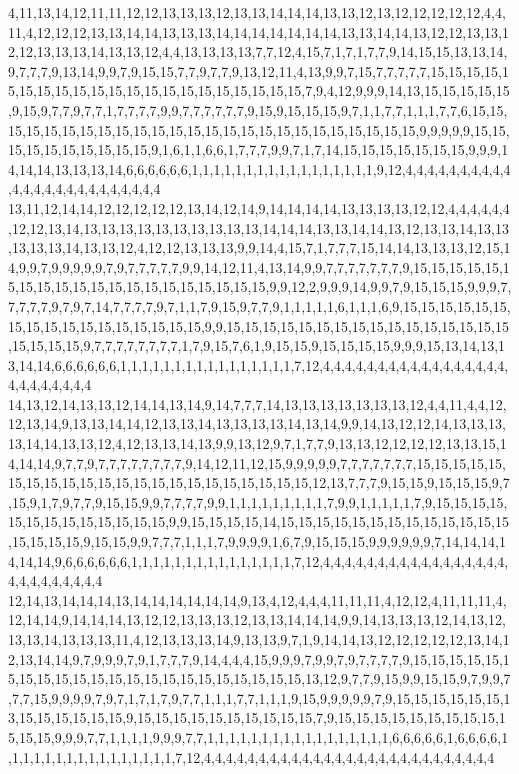 4,11,13,14,12,11,11,12,12,13,13,13,12,13,13,14,14,14,13,13,12,13,12,12,12,12,12,4,4,11,4,12,12,12,13,13,14,14,13,13,13,14,14,14,14,14,14,14,13,13,14,14,13,12,12,13,13,12,12,13,13,13,14,13,13,12,4,4,13,13,13,13,7,7,12,4,15,7,1,7,1,7,7,9,14,15,15,13,13,14,9,7,7,7,9,13,14,9,9,7,9,15,15,7,7,9,7,7,9,13,12,11,4,13,9,9,7,15,7,7,7,7,7,15,15,15,15,15,15,15,15,15,15,15,15,15,15,15,15,15,15,15,15,15,7,9,4,12,9,9,9,14,13,15,15,15,15,15,9,15,9,7,7,9,7,7,1,7,7,7,7,9,9,7,7,7,7,7,7,9,15,9,15,15,15,9,7,1,1,7,7,1,1,1,7,7,6,15,15,15,15,15,15,15,15,15,15,15,15,15,15,15,15,15,15,15,15,15,15,15,15,15,9,9,9,9,9,15,15,15,15,15,15,15,15,15,15,9,1,6,1,1,6,6,1,7,7,7,9,9,7,1,7,14,15,15,15,15,15,15,15,9,9,9,14,14,14,13,13,13,14,6,6,6,6,6,6,1,1,1,1,1,1,1,1,1,1,1,1,1,1,1,1,1,9,12,4,4,4,4,4,4,4,4,4,4,4,4,4,4,4,4,4,4,4,4,4,4,4,4
13,11,12,14,14,12,12,12,12,12,13,14,12,14,9,14,14,14,14,13,13,13,13,12,12,4,4,4,4,4,4,12,12,13,14,13,13,13,13,13,13,13,13,13,13,14,14,14,13,13,14,14,13,12,13,13,14,13,13,13,13,13,14,13,13,12,4,12,12,13,13,13,9,9,14,4,15,7,1,7,7,7,15,14,14,13,13,13,12,15,14,9,9,7,9,9,9,9,9,7,9,7,7,7,7,7,9,9,14,12,11,4,13,14,9,9,7,7,7,7,7,7,7,9,15,15,15,15,15,15,15,15,15,15,15,15,15,15,15,15,15,15,15,15,9,9,12,2,9,9,9,14,9,9,7,9,15,15,15,9,9,9,7,7,7,7,7,9,7,9,7,14,7,7,7,7,9,7,1,1,7,9,15,9,7,7,9,1,1,1,1,1,6,1,1,1,6,9,15,15,15,15,15,15,15,15,15,15,15,15,15,15,15,15,15,9,9,15,15,15,15,15,15,15,15,15,15,15,15,15,15,15,15,15,15,15,15,9,7,7,7,7,7,7,7,7,1,7,9,15,7,6,1,9,15,15,9,15,15,15,15,9,9,9,15,13,14,13,13,14,14,6,6,6,6,6,6,1,1,1,1,1,1,1,1,1,1,1,1,1,1,1,1,7,12,4,4,4,4,4,4,4,4,4,4,4,4,4,4,4,4,4,4,4,4,4,4,4,4,4
14,13,12,14,13,13,12,14,14,13,14,9,14,7,7,7,14,13,13,13,13,13,13,13,12,4,4,11,4,4,12,12,13,14,9,13,13,14,14,12,13,13,14,13,13,13,13,14,13,14,9,9,14,13,12,12,14,13,13,13,13,14,14,13,13,12,4,12,13,13,14,13,9,9,13,12,9,7,1,7,7,9,13,13,12,12,12,12,13,13,15,14,14,14,9,7,7,9,7,7,7,7,7,7,7,7,9,14,12,11,12,15,9,9,9,9,9,7,7,7,7,7,7,7,15,15,15,15,15,15,15,15,15,15,15,15,15,15,15,15,15,15,15,15,15,15,12,13,7,7,7,9,15,15,9,15,15,15,9,7,15,9,1,7,9,7,7,9,15,15,9,9,7,7,7,7,9,9,1,1,1,1,1,1,1,1,1,7,9,9,1,1,1,1,1,7,9,15,15,15,15,15,15,15,15,15,15,15,15,15,9,9,15,15,15,15,14,15,15,15,15,15,15,15,15,15,15,15,15,15,15,15,15,15,9,15,15,9,9,7,7,7,1,1,1,7,9,9,9,9,1,6,7,9,15,15,15,9,9,9,9,9,9,7,14,14,14,14,14,14,9,6,6,6,6,6,6,1,1,1,1,1,1,1,1,1,1,1,1,1,1,1,7,12,4,4,4,4,4,4,4,4,4,4,4,4,4,4,4,4,4,4,4,4,4,4,4,4,4,4
12,14,13,14,14,14,13,14,14,14,14,14,14,9,13,4,12,4,4,4,11,11,11,4,12,12,4,11,11,11,4,12,14,14,9,14,14,14,13,12,12,13,13,13,12,13,13,14,14,14,9,9,14,13,13,13,12,14,13,12,13,13,14,13,13,13,11,4,12,13,13,13,14,9,13,13,9,7,1,9,14,14,13,12,12,12,12,12,13,14,12,13,14,14,9,7,9,9,9,7,9,1,7,7,7,9,14,4,4,4,15,9,9,9,7,9,9,7,9,7,7,7,7,9,15,15,15,15,15,15,15,15,15,15,15,15,15,15,15,15,15,15,15,15,15,15,13,12,9,7,7,9,15,9,9,15,15,9,7,9,9,7,7,7,15,9,9,9,9,7,9,7,1,7,1,7,9,7,7,1,1,1,7,7,1,1,1,9,15,9,9,9,9,9,7,9,15,15,15,15,15,15,13,15,15,15,15,15,15,9,15,15,15,15,15,15,15,15,15,15,7,9,15,15,15,15,15,15,15,15,15,15,15,15,9,9,9,7,7,1,1,1,1,9,9,9,7,7,1,1,1,1,1,1,1,1,1,1,1,1,1,1,1,1,1,6,6,6,6,6,1,6,6,6,6,1,1,1,1,1,1,1,1,1,1,1,1,1,1,1,1,7,12,4,4,4,4,4,4,4,4,4,4,4,4,4,4,4,4,4,4,4,4,4,4,4,4,4,4,4
